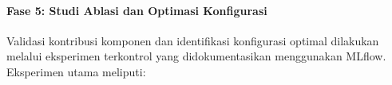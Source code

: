 \documentclass[12pt,a4paper]{article}
\begin{document}
% 

\paragraph{Fase 5: Studi Ablasi dan Optimasi Konfigurasi}
Validasi kontribusi komponen dan identifikasi konfigurasi optimal dilakukan melalui eksperimen terkontrol yang didokumentasikan menggunakan MLflow. Eksperimen utama meliputi:
\end{document}
